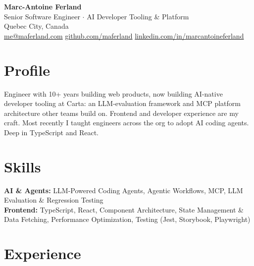 \documentclass[11pt]{article}
\begin{document}
\begin{center}
    {\LARGE \textbf{Marc-Antoine Ferland}} \\
    Senior Software Engineer $\cdot$ AI Developer Tooling \& Platform \\
    Quebec City, Canada \\
    \href{mailto:me@maferland.com}{me@maferland.com} \quad
    \href{https://github.com/maferland}{github.com/maferland} \quad
    \href{https://linkedin.com/in/marcantoineferland}{linkedin.com/in/marcantoineferland}
\end{center}

\section*{Profile}
Engineer with 10+ years building web products, now building AI-native developer tooling at Carta: an LLM-evaluation framework and MCP platform architecture other teams build on. Frontend and developer experience are my craft. Most recently I taught engineers across the org to adopt AI coding agents. Deep in TypeScript and React.

\section*{Skills}
\textbf{AI \& Agents:} LLM-Powered Coding Agents, Agentic Workflows, MCP, LLM Evaluation \& Regression Testing \\
\textbf{Frontend:} TypeScript, React, Component Architecture, State Management \& Data Fetching, Performance Optimization, Testing (Jest, Storybook, Playwright)

\section*{Experience}
\end{document}
